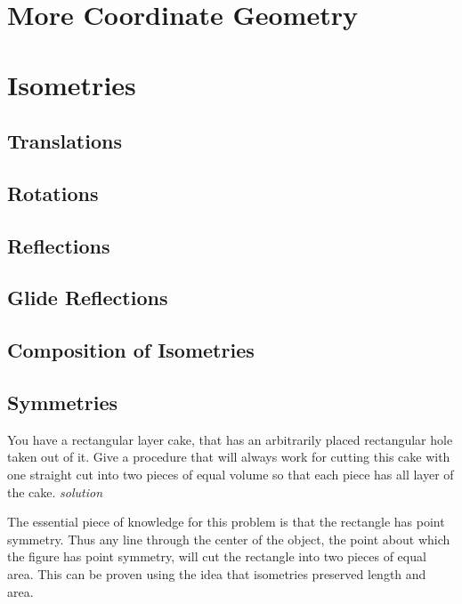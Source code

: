 \documentclass{amsbook}
\begin{document}
\chapter{More Coordinate Geometry}

\chapter{Isometries}

\section{Translations}

\section{Rotations}

\section{Reflections}

\section{Glide Reflections}

\section{Composition of Isometries}

\section{Symmetries}
\begin{Exercise}[title={Layer Cake} ,difficulty=2 , label=8f1 ]
	You have a rectangular layer cake, that has an arbitrarily placed rectangular hole taken out of it. Give a procedure that will always work for cutting this cake with one straight cut into two pieces of equal volume so that each piece has all layer of the cake. 
	\hfill \emph{solution} 
\end{Exercise}
\begin{Answer}[ref={8f1}]
	The essential piece of knowledge for this problem is that the rectangle has point symmetry. Thus any line through the center of the object, the point about which the figure has point symmetry, will cut the rectangle into two pieces of equal area. This can be proven using the idea that isometries preserved length and area. 
\end{Answer}
\end{document}
